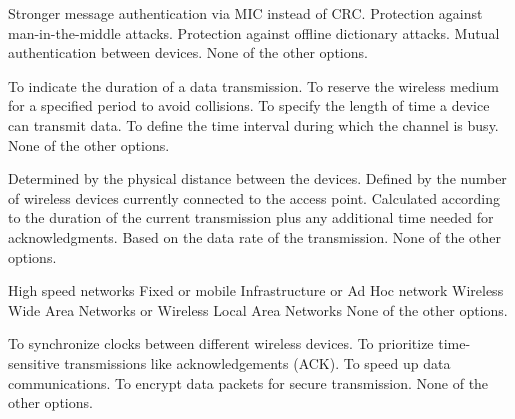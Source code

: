 \begin{checkboxes}
    \choice Stronger message authentication via MIC instead of CRC.
    \CorrectChoice Protection against man-in-the-middle attacks.
    \CorrectChoice Protection against offline dictionary attacks.
    \CorrectChoice Mutual authentication between devices.
    \choice None of the other options.
\end{checkboxes}

\begin{checkboxes}
    \choice To indicate the duration of a data transmission.
    \CorrectChoice To reserve the wireless medium for a specified period to avoid collisions.
    \choice To specify the length of time a device can transmit data.
    \choice To define the time interval during which the channel is busy.
    \choice None of the other options.
\end{checkboxes}

\begin{checkboxes}
    \choice Determined by the physical distance between the devices.
    \choice Defined by the number of wireless devices currently connected to the access point.
    \CorrectChoice Calculated according to the duration of the current transmission plus any additional time needed for acknowledgments.
    \choice Based on the data rate of the transmission.
    \choice None of the other options.
\end{checkboxes}

\begin{checkboxes}
    \choice High speed networks
    \CorrectChoice Fixed or mobile
    \CorrectChoice Infrastructure or Ad Hoc network
    \CorrectChoice Wireless Wide Area Networks or Wireless Local Area Networks
    \choice None of the other options.
\end{checkboxes}

\begin{checkboxes}
    \choice To synchronize clocks between different wireless devices.
    \choice To prioritize time-sensitive transmissions like acknowledgements (ACK).
    \choice To speed up data communications.
    \choice To encrypt data packets for secure transmission.
    \CorrectChoice None of the other options.
\end{checkboxes}

